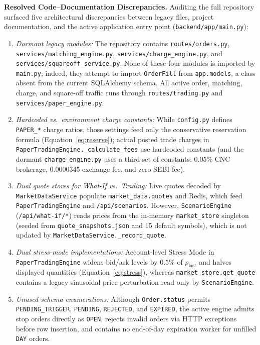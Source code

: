 \documentclass[journal,onecolumn,10pt]{IEEEtran}
\begin{document}
\textbf{Resolved Code--Documentation Discrepancies.} Auditing the full repository surfaced five architectural discrepancies between legacy files, project documentation, and the active application entry point (\texttt{backend/app/main.py}):
\begin{enumerate}
  \item \emph{Dormant legacy modules:} The repository contains \texttt{routes/orders.py}, \texttt{services/matching\_engine.py}, \texttt{services/charge\_engine.py}, and \texttt{services/squareoff\_service.py}. None of these four modules is imported by \texttt{main.py}; indeed, they attempt to import \texttt{OrderFill} from \texttt{app.models}, a class absent from the current SQLAlchemy schema. All active order, matching, charge, and square-off traffic runs through \texttt{routes/trading.py} and \texttt{services/paper\_engine.py}.
  \item \emph{Hardcoded vs.\ environment charge constants:} While \texttt{config.py} defines \texttt{PAPER\_*} charge ratios, those settings feed only the conservative reservation formula (Equation~\eqref{eq:reserve}); actual posted trade charges in \texttt{PaperTradingEngine.\_calculate\_fees} use hardcoded constants (and the dormant \texttt{charge\_engine.py} uses a third set of constants: $0.05\%$ CNC brokerage, $0.0000345$ exchange fee, and zero SEBI fee).
  \item \emph{Dual quote stores for What-If vs.\ Trading:} Live quotes decoded by \texttt{MarketDataService} populate \texttt{market\_data.quotes} and Redis, which feed \texttt{PaperTradingEngine} and \texttt{/api/scenarios}. However, \texttt{ScenarioEngine} (\texttt{/api/what-if/*}) reads prices from the in-memory \texttt{market\_store} singleton (seeded from \texttt{quote\_snapshots.json} and 15 default symbols), which is not updated by \texttt{MarketDataService.\_record\_quote}.
  \item \emph{Dual stress-mode implementations:} Account-level Stress Mode in \texttt{PaperTradingEngine} widens bid/ask levels by $0.5\%$ of $p_{\mathrm{last}}$ and halves displayed quantities (Equation~\eqref{eq:stress}), whereas \texttt{market\_store.get\_quote} contains a legacy sinusoidal price perturbation read only by \texttt{ScenarioEngine}.
  \item \emph{Unused schema enumerations:} Although \texttt{Order.status} permits \texttt{PENDING\_TRIGGER}, \texttt{PENDING}, \texttt{REJECTED}, and \texttt{EXPIRED}, the active engine admits stop orders directly as \texttt{OPEN}, rejects invalid orders via HTTP exceptions before row insertion, and contains no end-of-day expiration worker for unfilled \texttt{DAY} orders.
\end{enumerate}
\end{document}
